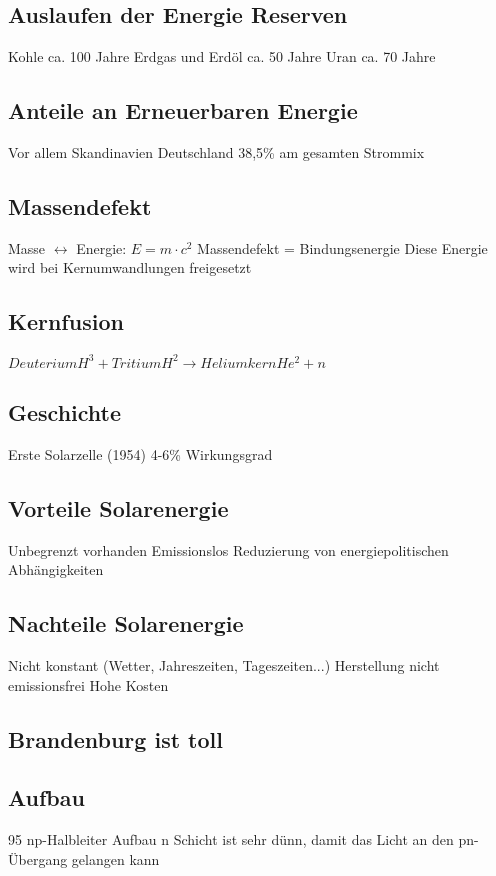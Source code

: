 
\subsection{Auslaufen der Energie Reserven}
Kohle ca. 100 Jahre
Erdgas und Erdöl ca. 50 Jahre
Uran ca. 70 Jahre

\subsection{Anteile an Erneuerbaren Energie}
Vor allem Skandinavien
Deutschland 38,5\% am gesamten Strommix

\subsection{Massendefekt}
Masse $\leftrightarrow$ Energie: $E = m\cdot c^2$
Massendefekt = Bindungsenergie
Diese Energie wird bei Kernumwandlungen freigesetzt

\subsection{Kernfusion}
$Deuterium H^3 + Tritium H^2 \rightarrow Heliumkern He^2 + n$

\subsection{Geschichte}
Erste Solarzelle (1954)
4-6\% Wirkungsgrad

\subsection{Vorteile Solarenergie}
Unbegrenzt vorhanden
Emissionslos
Reduzierung von energiepolitischen Abhängigkeiten

\subsection{Nachteile Solarenergie}
Nicht konstant (Wetter, Jahreszeiten, Tageszeiten...)
Herstellung nicht emissionsfrei
Hohe Kosten

\subsection{Brandenburg ist toll}

\subsection{Aufbau}
95%
np-Halbleiter Aufbau
n Schicht ist sehr dünn, damit das Licht an den pn-Übergang gelangen kann


